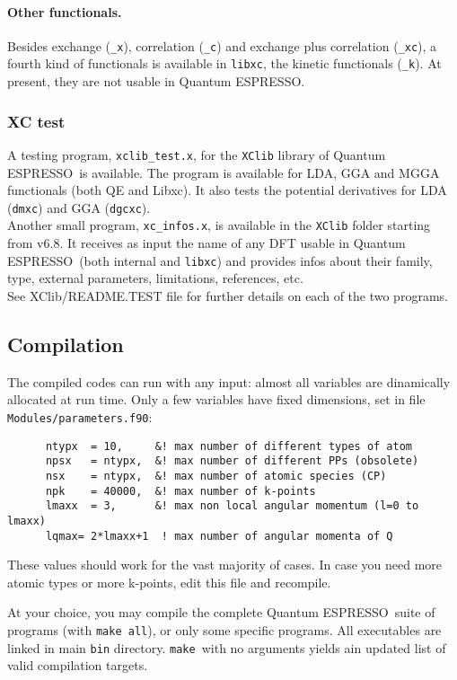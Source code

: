 \documentclass[12pt,a4paper]{article}
\def\qe{{\sc Quantum ESPRESSO}}
\def\make{\texttt{make}}
\def\libxc{\texttt{libxc}}
\begin{document}
\paragraph{Other functionals.} Besides exchange (\texttt{\_x}), correlation (\texttt{\_c}) and exchange plus correlation (\texttt{\_xc}), a fourth kind of functionals is available in \libxc, the kinetic functionals (\texttt{\_k}). At present, they are not usable in \qe.
%
\subsubsection{XC test}
\label{SubSec:XCtest}
A testing program, \texttt{xclib\_test.x}, for the \texttt{XClib} library of \qe\ is available. The program is available for LDA, GGA and MGGA functionals (both QE and Libxc). It also tests the potential derivatives for LDA (\texttt{dmxc}) and GGA (\texttt{dgcxc}).\\
Another small program, \texttt{xc\_infos.x}, is available in the \texttt{XClib} folder starting from v6.8. It receives as input the name of any DFT usable in \qe\ (both internal and \libxc) and provides infos about their family, type, external parameters, limitations, references, etc.\\
See XClib/README.TEST file for further details on each of the two programs.

\subsection{Compilation}
\label{SubSec:Compilation}

The compiled codes can run with any input: almost all variables are
dinamically allocated at run time. Only a few variables have fixed
dimensions, set in file \texttt{Modules/parameters.f90}:
\begin{verbatim}
      ntypx  = 10,     &! max number of different types of atom
      npsx   = ntypx,  &! max number of different PPs (obsolete)
      nsx    = ntypx,  &! max number of atomic species (CP)
      npk    = 40000,  &! max number of k-points
      lmaxx  = 3,      &! max non local angular momentum (l=0 to lmaxx)
      lqmax= 2*lmaxx+1  ! max number of angular momenta of Q
\end{verbatim}
These values should work for the vast majority of cases. In case you need
more atomic types or more k-points, edit this file and recompile.

At your choice, you may compile the complete \qe\ suite of programs
(with \texttt{make all}), or only some specific programs.
All executables are linked in main \texttt{bin} directory.
\make\ with no arguments yields ain updated list of valid compilation targets.
\end{document}
